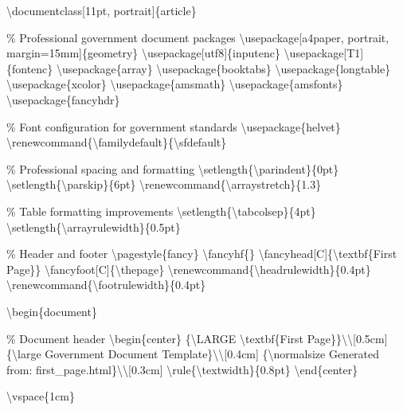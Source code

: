 \textbackslash{}documentclass[11pt, portrait]\{article\}

\% Professional government document packages
\textbackslash{}usepackage[a4paper, portrait, margin=15mm]\{geometry\}
\textbackslash{}usepackage[utf8]\{inputenc\}
\textbackslash{}usepackage[T1]\{fontenc\}
\textbackslash{}usepackage\{array\}
\textbackslash{}usepackage\{booktabs\}
\textbackslash{}usepackage\{longtable\}
\textbackslash{}usepackage\{xcolor\}
\textbackslash{}usepackage\{amsmath\}
\textbackslash{}usepackage\{amsfonts\}
\textbackslash{}usepackage\{fancyhdr\}

\% Font configuration for government standards
\textbackslash{}usepackage\{helvet\}
\textbackslash{}renewcommand\{\textbackslash{}familydefault\}\{\textbackslash{}sfdefault\}

\% Professional spacing and formatting
\textbackslash{}setlength\{\textbackslash{}parindent\}\{0pt\}
\textbackslash{}setlength\{\textbackslash{}parskip\}\{6pt\}
\textbackslash{}renewcommand\{\textbackslash{}arraystretch\}\{1.3\}

\% Table formatting improvements
\textbackslash{}setlength\{\textbackslash{}tabcolsep\}\{4pt\}
\textbackslash{}setlength\{\textbackslash{}arrayrulewidth\}\{0.5pt\}

\% Header and footer
\textbackslash{}pagestyle\{fancy\}
\textbackslash{}fancyhf\{\}
\textbackslash{}fancyhead[C]\{\textbackslash{}textbf\{First Page\}\}
\textbackslash{}fancyfoot[C]\{\textbackslash{}thepage\}
\textbackslash{}renewcommand\{\textbackslash{}headrulewidth\}\{0.4pt\}
\textbackslash{}renewcommand\{\textbackslash{}footrulewidth\}\{0.4pt\}

\textbackslash{}begin\{document\}

\% Document header
\textbackslash{}begin\{center\}
\{\textbackslash{}LARGE \textbackslash{}textbf\{First Page\}\}\textbackslash{}\textbackslash{}[0.5cm]
\{\textbackslash{}large Government Document Template\}\textbackslash{}\textbackslash{}[0.4cm]
\{\textbackslash{}normalsize Generated from: first\_page.html\}\textbackslash{}\textbackslash{}[0.3cm]
\textbackslash{}rule\{\textbackslash{}textwidth\}\{0.8pt\}
\textbackslash{}end\{center\}

\textbackslash{}vspace\{1cm\}

